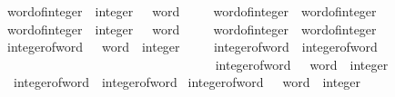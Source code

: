 \begin{isabellebody}
\ word{}{}{\isacharunderscore}{\kern0pt}of{\isacharunderscore}{\kern0pt}integer\ {\isacharcolon}{\kern0pt}{\isacharcolon}{\kern0pt}\ {\isachardoublequoteopen}integer\ {\isasymRightarrow}\ {}{}\ word{\isachardoublequoteclose}\isanewline
\ \ \isanewline
\ \ {\isachardoublequoteopen}word{}{}{\isacharunderscore}{\kern0pt}of{\isacharunderscore}{\kern0pt}integer\ {\isasymequiv}\ word{\isacharunderscore}{\kern0pt}of{\isacharunderscore}{\kern0pt}integer{\isachardoublequoteclose}\isanewline
\isanewline
{}\isamarkupfalse%
\ word{}{}{\isacharunderscore}{\kern0pt}of{\isacharunderscore}{\kern0pt}integer\ {\isacharcolon}{\kern0pt}{\isacharcolon}{\kern0pt}\ {\isachardoublequoteopen}integer\ {\isasymRightarrow}\ {}{}\ word{\isachardoublequoteclose}\isanewline
\ \ \isanewline
\ \ {\isachardoublequoteopen}word{}{}{\isacharunderscore}{\kern0pt}of{\isacharunderscore}{\kern0pt}integer\ {\isasymequiv}\ word{\isacharunderscore}{\kern0pt}of{\isacharunderscore}{\kern0pt}integer{\isachardoublequoteclose}\isanewline
\isanewline
{}\isamarkupfalse%
\ integer{\isacharunderscore}{\kern0pt}of{\isacharunderscore}{\kern0pt}word{}\ {\isacharcolon}{\kern0pt}{\isacharcolon}{\kern0pt}\ {\isachardoublequoteopen}{}\ word\ {\isasymRightarrow}\ integer{\isachardoublequoteclose}\isanewline
\ \ \isanewline
\ \ {\isachardoublequoteopen}integer{\isacharunderscore}{\kern0pt}of{\isacharunderscore}{\kern0pt}word{}\ {\isasymequiv}\ integer{\isacharunderscore}{\kern0pt}of{\isacharunderscore}{\kern0pt}word{\isachardoublequoteclose}\isanewline
\ \ \ \ \ \ \ \ \ \ \ \ \ \ \ \ \ \ \ \ \ \ \ \ \ \ \ \ \ \ \ \ \isanewline
{}\isamarkupfalse%
\ integer{\isacharunderscore}{\kern0pt}of{\isacharunderscore}{\kern0pt}word{}{}\ {\isacharcolon}{\kern0pt}{\isacharcolon}{\kern0pt}\ {\isachardoublequoteopen}{}{}\ word\ {\isasymRightarrow}\ integer{\isachardoublequoteclose}\isanewline
\ \ \isanewline
\ \ {\isachardoublequoteopen}integer{\isacharunderscore}{\kern0pt}of{\isacharunderscore}{\kern0pt}word{}{}\ {\isasymequiv}\ integer{\isacharunderscore}{\kern0pt}of{\isacharunderscore}{\kern0pt}word{\isachardoublequoteclose}\isanewline
\isanewline
{}\isamarkupfalse%
\ integer{\isacharunderscore}{\kern0pt}of{\isacharunderscore}{\kern0pt}word{}{}\ {\isacharcolon}{\kern0pt}{\isacharcolon}{\kern0pt}\ {\isachardoublequoteopen}{}{}\ word\ {\isasymRightarrow}\ integer{\isachardoublequoteclose}\isanewline

\end{isabellebody}
